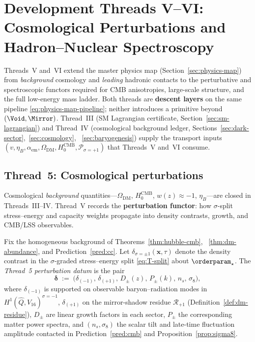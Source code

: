 \section{Development Threads V--VI: Cosmological Perturbations and
Hadron--Nuclear Spectroscopy}
\label{sec:threads-5-6}

Threads~V and~VI extend the master physics map
(Section~\ref{sec:physics-map}) from \emph{background} cosmology and
\emph{leading} hadronic contacts to the perturbative and spectroscopic
functors required for CMB anisotropies, large-scale structure, and the
full low-energy mass ladder. Both threads are \textbf{descent layers} on the
same pipeline \eqref{eq:physics-map-pipeline}; neither introduces a primitive
beyond $(\Void,\Mirror)$. Thread~III (SM Lagrangian certificate,
Section~\ref{sec:sm-lagrangian}) and Thread~IV (cosmological background
ledger, Sections~\ref{sec:dark-sector},~\ref{sec:cosmology},
~\ref{sec:baryogenesis}) supply the transport inputs $(v,\eta_B,\alpha_{\mathrm{em}},
\Omega_{\mathrm{DM}},H_0^{\mathrm{CMB}},\mathcal{P}_{\sigma=+1})$ that
Threads~V and~VI consume.

\subsection{Thread~5: Cosmological perturbations}
\label{sec:thread-5}

Cosmological \emph{background} quantities---$\Omega_{\mathrm{DM}}$,
$H_0^{\mathrm{CMB}}$, $w(z)\approx -1$, $\eta_B$---are closed in
Threads~III--IV. Thread~V records the \textbf{perturbation functor}: how
$\sigma$-split stress--energy and capacity weights propagate into density
contrasts, growth, and CMB/LSS observables.

\begin{definition}
\label{def:thread5-pert}
Fix the homogeneous background of Theorems~\ref{thm:hubble-cmb},
~\ref{thm:dm-abundance}, and Prediction~\ref{pred:cc}. Let
$\delta_{\sigma=\pm1}(\mathbf{x},\tau)$ denote the density contrast in the
$\sigma$-graded stress--energy split \eqref{eq:T-split} about
$\orderparam_\star$. The \emph{Thread~5 perturbation datum} is the pair
\begin{equation}\label{eq:thread5-datum}
  \boldsymbol{\delta}
  \;:=\;
  \bigl(
    \delta_{(-1)},\,\delta_{(+1)},\,D_\pm(z),\,P_\pm(k),\,n_s,\,\sigma_8
  \bigr),
\end{equation}
where $\delta_{(-1)}$ is supported on observable baryon--radiation modes in
$H^1(\hat Q,V_{16})^{\sigma=-1}$, $\delta_{(+1)}$ on the mirror-shadow
residue $\mathcal{R}_{+1}$ (Definition~\ref{def:dm-residue}), $D_\pm$ are
linear growth factors in each sector, $P_\pm$ the corresponding matter power
spectra, and $(n_s,\sigma_8)$ the scalar tilt and late-time fluctuation
amplitude contacted in Prediction~\ref{pred:cmb} and
Proposition~\ref{prop:sigma8}.
\end{definition}

